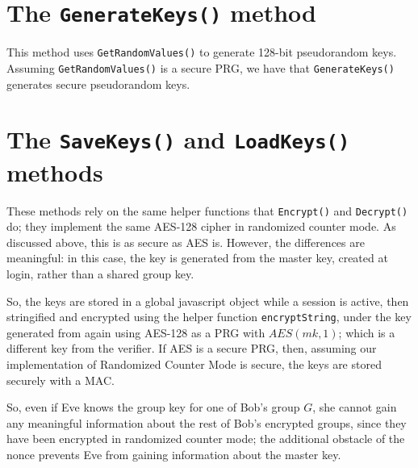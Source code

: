 \documentclass{amsart}
\begin{document}
\section{The \texttt{GenerateKeys()} method}%
This method uses \verb+GetRandomValues()+ to generate 128-bit pseudorandom keys. Assuming \verb+GetRandomValues()+ is a secure PRG, we have that \texttt{GenerateKeys()} generates secure pseudorandom keys.

\section{The \texttt{SaveKeys()} and \texttt{LoadKeys()} methods}%
These methods rely on the same helper functions that \verb+Encrypt()+ and \verb+Decrypt()+ do; they implement the same AES-128 cipher in randomized counter mode. As discussed above, this is as secure as AES is. However, the differences are meaningful: in this case, the key is generated from the master key, created at login, rather than a shared group key.

So, the keys are stored in a global javascript object while a session is active, then stringified and encrypted using the helper function \verb+encryptString+, under the key generated from again using AES-128 as a PRG with $AES(mk, 1)$; which is a different key from the verifier. If AES is a secure PRG, then, assuming our implementation of Randomized Counter Mode is secure, the keys are stored securely with a MAC.

So, even if Eve knows the group key for one of Bob's group $G$, she cannot gain any meaningful information about the rest of Bob's encrypted groups, since they have been encrypted in randomized counter mode; the additional obstacle of the nonce prevents Eve from gaining information about the master key.

\end{document}
